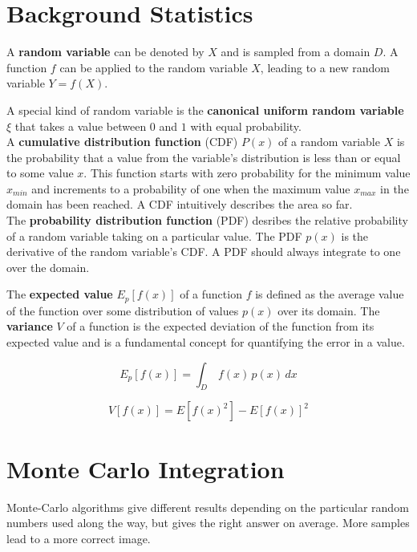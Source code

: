 

\section{Background Statistics}
A \textbf{random variable} can be denoted by $X$ and is sampled from a domain $D$. A function $f$ can be applied to the random variable $X$, leading to a new random variable $Y = f(X)$.

A special kind of random variable is the \textbf{canonical uniform random variable} $\xi$ that takes a value between $0$ and $1$ with equal probability.\\

A \textbf{cumulative distribution function} (CDF) $P(x)$ of a random variable $X$ is the probability that a value from the variable's distribution is less than or equal to some value $x$. This function starts with zero probability for the minimum value $x_{min}$ and increments to a probability of one when the maximum value $x_{max}$ in the domain has been reached. A CDF intuitively describes the area so far.\\

The \textbf{probability distribution function} (PDF) desribes the relative probability of a random variable taking on a particular value. The PDF $p(x)$ is the derivative of the random variable's CDF. A PDF should always integrate to one over the domain.

The \textbf{expected value} $E_p[ f(x) ]$ of a function $f$ is defined as the average value of the function over some distribution of values $p(x)$ over its domain.
The \textbf{variance} $V$ of a function is the expected deviation of the function from its expected value and is a fundamental concept for quantifying the error in a value.

\begin{equation}
E_p[ f(x) ] = \int_D\, f(x)\, p(x)\, dx
\end{equation}

\begin{equation}
V[ f(x) ] = E[ f(x)^2 ] - E[ f(x) ]^2
\end{equation}

\section{Monte Carlo Integration}

Monte-Carlo algorithms give different results depending on the particular random numbers used along the way, but gives the right answer on average. More samples lead to a more correct image.

